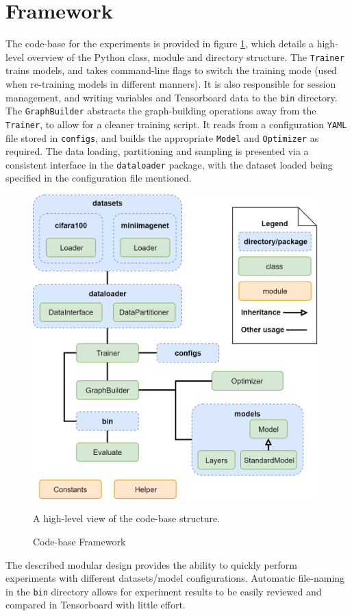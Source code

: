 \documentclass{report}
\begin{document}
	\section{Framework}
	The code-base for the experiments is provided in figure \ref{fig:framework:1}, which details a high-level overview of the Python class, module and directory structure. The \texttt{Trainer} trains models, and takes command-line flags to switch the training mode (used when re-training models in different manners). It is also responsible for session management, and writing variables and Tensorboard data to the \texttt{bin} directory. The \texttt{GraphBuilder} abstracts the graph-building operations away from the \texttt{Trainer}, to allow for a cleaner training script. It reads from a configuration \texttt{YAML} file stored in \texttt{configs}, and builds the appropriate \texttt{Model} and \texttt{Optimizer} as required. The data loading, partitioning and sampling is presented via a consistent interface in the \texttt{dataloader} package, with the dataset loaded being specified in the configuration file mentioned. \par
	\begin{figure}[h]
		\centering
		\includegraphics[width=11cm]{codeframework}
		\caption{Code-base Framework}
		A high-level view of the code-base structure. 
		\label{fig:framework:1}
	\end{figure}
	The described modular design provides the ability to quickly perform experiments with different datasets/model configurations. Automatic file-naming in the \texttt{bin} directory allows for experiment results to be easily reviewed and compared in Tensorboard with little effort. \par
	
\end{document}
